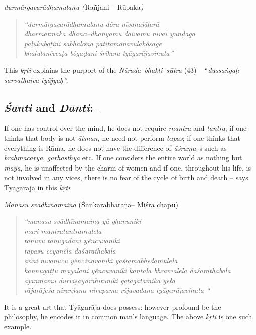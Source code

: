 \textit{durmārgacarādhamulanu (}Rañjani – Rūpaka\textit{)}

\begin{verse}
\textit{“durmārgacarādhamulanu dôra nīvanajālarā}\\\textit{dharmātmaka dhana–dhānyamu daivamu nīvai yunḍaga}\\\textit{palukuboṭini sabhalona patitamānavulakôsage}\\\textit{khalulanêccaṭa bôgaḍani śrīkara tyāgarājavinuta”}
\end{verse}

This \textit{kṛti} explains the purport of the \textit{Nārada–bhakti–sūtra} (43) – “\textit{dussaṅgaḥ sarvathaiva tyājyaḥ”.}


\subsection*{\textit{Śānti} and \textit{Dānti}:–}

If one has control over the mind, he does not require \textit{mantra} and \textit{tantra}; if one thinks that body is not \textit{ātman,} he need not perform \textit{tapas}; if one thinks that everything is Rāma, he does not have the difference of \textit{āśrama}–s such as \textit{brahmacarya}, \textit{gārhasthya} etc. If one considers the entire world as nothing but \textit{māyā}, he is unaffected by the charm of women and if one, throughout his life, is not involved in any vices, there is no fear of the cycle of birth and death – says Tyāgarāja in this \textit{kṛti}:

\textit{Manasu svādhīnamaina} (Śaṅkarābharaṇa– Miśra chāpu)

\begin{verse}
\textit{“manasu svādhīnamaina yā ghanuniki}\\\textit{mari mantratantramulela}\\\textit{tanuvu tānugādani yêncuvāniki}\\\textit{tapasu ceyanêla daśarathabāla}\\\textit{anni nīvanucu yêncinavāniki yāśramabhedamulela}\\\textit{kannugaṭṭu māyalani yêncuvāniki kāntala bhramalela daśarathabāla}\\\textit{ājanmamu durviṣayarahituniki gatāgatamika yela}\\\textit{rājarājeśa niranjana nirupama rājavadana tyāgarājavinuta “}
\end{verse}

It is a great art that Tyāgarāja does possess: however profound be the philosophy, he encodes it in common man’s language. The above \textit{kṛti} is one such example. 

